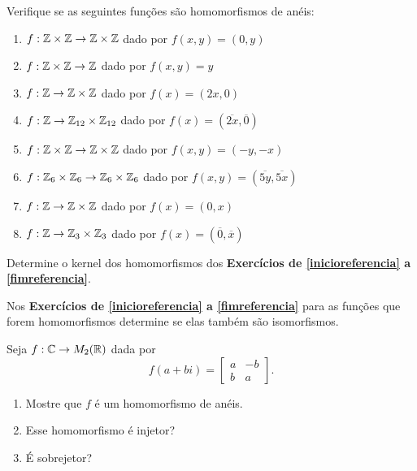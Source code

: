 \documentclass[12pt]{exam}
\begin{document}
     Verifique se as seguintes funções são homomorfismos de anéis:
    \begin{enumerate}[label=({\alph*})]
        \item $f : \mathbb{Z}\times\mathbb{Z} \to \mathbb{Z}\times\mathbb{Z}$ dado por $f(x,y) = (0,y)$

        \item $f : \mathbb{Z}\times\mathbb{Z} \to \mathbb{Z}$ dado por $f(x,y) = y$

        \item $f : \mathbb{Z}\to \mathbb{Z}\times\mathbb{Z}$ dado por $f(x) = (2x,0)$

        \item $f : \mathbb{Z}\to \mathbb{Z}_{12}\times\mathbb{Z}_{12}$ dado por $f(x) = (\overline{2x},\overline{0})$

        \item $f : \mathbb{Z}\times\mathbb{Z} \to \mathbb{Z}\times\mathbb{Z}$ dado por $f(x,y) = (-y,-x)$

        \item $f : \mathbb{Z}_6\times\mathbb{Z}_6 \to \mathbb{Z}_6\times\mathbb{Z}_6$ dado por $f(x,y) = (\overline{5y},\overline{5x})$

        \item $f : \mathbb{Z} \to \mathbb{Z}\times\mathbb{Z}$ dado por $f(x) = (0,x)$

        \item $f : \mathbb{Z} \to \mathbb{Z}_3\times\mathbb{Z}_3$ dado por $f(x) = (\overline{0},\overline{x})$
    \end{enumerate}

    \vspace{.3cm}

    \questao{} Determine o kernel dos homomorfismos dos \textbf{Exercícios de \ref{inicioreferencia} a \ref{fimreferencia}}.

    \vspace{.3cm}

    \questao{} Nos \textbf{Exercícios de \ref{inicioreferencia} a \ref{fimreferencia}} para as funções que forem homomorfismos determine se elas também são isomorfismos.

    \vspace{.3cm}

    \questao{} Seja $f : \mathbb{C} \to M_2(\mathbb{R})$ dada por
    \[
        f(a + bi) = \begin{bmatrix}
            a & -b\\
            b & a
        \end{bmatrix}.
    \]
    \begin{enumerate}[label=({\alph*})]
        \item Mostre que $f$ é um homomorfismo de anéis.

        \item Esse homomorfismo é injetor?

        \item É sobrejetor?
    \end{enumerate}
\end{document}
